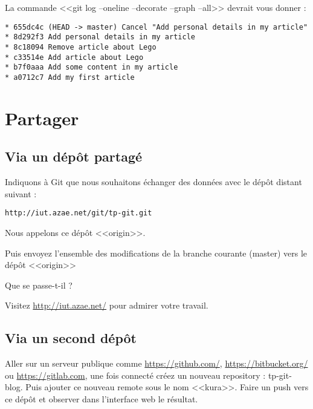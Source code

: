 \documentclass[a4paper]{article}
\begin{document}
La commande <<git log --oneline --decorate --graph --all>> devrait vous donner :
\begin{verbatim}
* 655dc4c (HEAD -> master) Cancel "Add personal details in my article"
* 8d292f3 Add personal details in my article
* 8c18094 Remove article about Lego
* c33514e Add article about Lego
* b7f0aaa Add some content in my article
* a0712c7 Add my first article
\end{verbatim}

\section{Partager}

\subsection{Via un dépôt partagé}

Indiquons à Git que nous souhaitons échanger des données avec le dépôt distant suivant : \begin{verbatim}http://iut.azae.net/git/tp-git.git\end{verbatim}
Nous appelons ce dépôt <<origin>>.

Puis envoyez l'ensemble des modifications de la branche courante (master) vers le dépôt <<origin>>

Que se passe-t-il ?

Visitez \url{http://iut.azae.net/} pour admirer votre travail.

\subsection{Via un second dépôt}

Aller sur un serveur publique comme \url{https://github.com/}, \url{https://bitbucket.org/} ou \url{https://gitlab.com}, une fois connecté créez un nouveau repository : tp-git-blog. Puis ajouter ce nouveau remote sous le nom <<kura>>. Faire un push vers ce dépôt et observer dans l'interface web le résultat.
\end{document}
